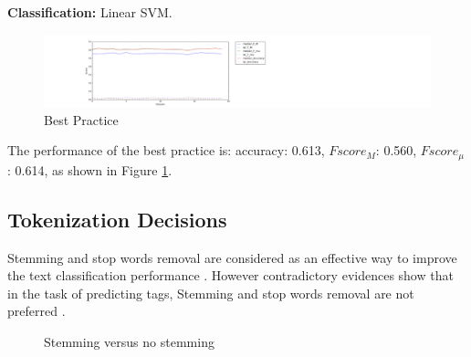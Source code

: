 \documentclass{sig-alternate-05-2015}
\begin{document}
\textbf{Classification:} Linear SVM.

\begin{figure}[ht]
  \includegraphics[width=\linewidth]{./fig/best.png}
  \caption{Best Practice}
  \label{fig:best}
\end{figure}

The performance of the best practice is: accuracy: 0.613, $Fscore_{M}$: 0.560, $Fscore_{\mu}$: 0.614, as shown in Figure \ref{fig:best}. 

\subsection{Tokenization Decisions}

Stemming and stop words removal are considered as an effective way to improve the text classification performance \cite{yang1997comparative}. However contradictory evidences show that in the task of predicting tags, Stemming and stop words removal are not preferred \cite{moharanatag,stanley2013predicting}.

\begin{figure}[ht]
    \centering
    \quad
    \quad
    \caption{Stemming versus no stemming}
    \label{fig:stem}
\end{figure}
\end{document}
